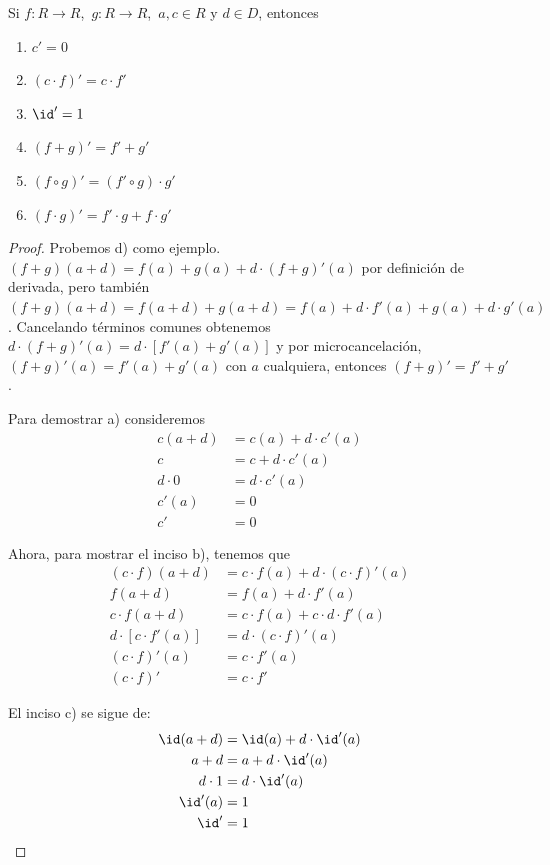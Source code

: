 \begin{theorem}[label=thm:reglasderivada]
  Si $f\colon  R\to R$,\ $g\colon  R\to R$,\ $a,c\in R$ y $d\in D$, entonces
\begin{enumerate}[label=\textbf{\alph*)}]
    \item $c' = 0$
    \item $(c\cdot f)' =c\cdot f'$
    \item $\id' = 1$
    \item $(f+g)'=f'+g'$
    \item $(f\circ g)' =(f'\circ g)\cdot g'$
    \item $(f\cdot g)' =f'\cdot g+f\cdot g'$
\end{enumerate}
\end{theorem}
\begin{proof}
  Probemos d) como ejemplo. $(f+g)(a+d) = f(a)+g(a)+d\cdot (f+g)'(a)$
  por definición de derivada, pero también $(f+g)(a+d) = f(a+d)+g(a+d)=f(a)+d\cdot f'(a)+g(a)
  +d\cdot g'(a)$. Cancelando términos comunes obtenemos $d\cdot (f+g)'(a) = d \cdot[f'(a)+g'(a)]$
  y por microcancelación, $(f+g)'(a)=f'(a)+g'(a)$ con $a$ cualquiera, entonces
  $(f+g)'=f'+g'$.
  
  Para demostrar a) consideremos
  \begin{align*}
   c(a+d) &= c(a)+d\cdot c'(a)\\
    c &= c+d\cdot c'(a)\\
    d\cdot 0 &= d\cdot c'(a)\\
    c'(a) &= 0\\
    c' &= 0
  \end{align*}

  Ahora, para mostrar el inciso b), tenemos que
  \begin{align*}
     (c\cdot f)(a+d) &= c\cdot f(a)+d\cdot (c\cdot f)'(a)\\
      f(a+d) &= f(a)+d\cdot f'(a)\\
      c\cdot f(a+d) &= c\cdot f(a)+ c\cdot d\cdot f'(a)\\
      d\cdot [c\cdot f'(a)] &= d\cdot (c\cdot f)'(a)\\
      (c\cdot f)'(a) &=c\cdot f'(a)\\
      (c\cdot f)' &=c\cdot f' 
  \end{align*}

  El inciso c) se sigue de:
  \begin{align*}
     \id (a+d) &= \id (a)+d\cdot \id '(a)\\
      a+d &= a+d\cdot \id '(a)\\
      d\cdot 1 &= d\cdot \id '(a)\\
      \id '(a) &= 1\\
      \id ' &= 1\\
  \end{align*}


\end{proof}
